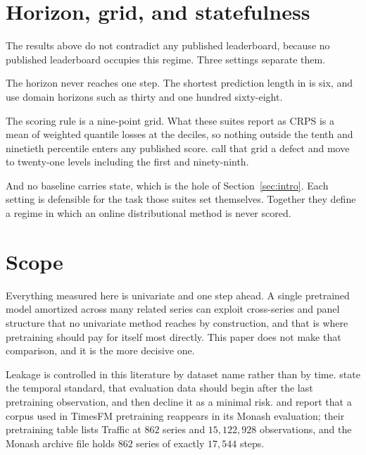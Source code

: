 \documentclass[article]{jss}
\begin{document}
\section{Horizon, grid, and statefulness}\label{sec:suites}

The results above do not contradict any published leaderboard, because no
published leaderboard occupies this regime. Three settings separate them.

The horizon never reaches one step. The shortest prediction length in
\citet{aksu2024gifteval} is six, and \citet{shchur2025fevbench} use domain
horizons such as thirty and one hundred sixty-eight.

The scoring rule is a nine-point grid. What these suites report as CRPS is a
mean of weighted quantile losses at the deciles, so nothing outside the tenth
and ninetieth percentile enters any published score.
\citet{ansari2025chronos2} call that grid a defect and move to twenty-one
levels including the first and ninety-ninth.

And no baseline carries state, which is the hole of Section~\ref{sec:intro}.
Each setting is defensible for the task those suites set themselves. Together
they define a regime in which an online distributional method is never scored.

\section{Scope}\label{sec:scope}

Everything measured here is univariate and one step ahead. A single pretrained
model amortized across many related series can exploit cross-series and panel
structure that no univariate method reaches by construction, and that is where
pretraining should pay for itself most directly. This paper does not make that
comparison, and it is the more decisive one.

Leakage is controlled in this literature by dataset name rather than by time.
\citet{ansari2024chronos} state the temporal standard, that evaluation data
should begin after the last pretraining observation, and then decline it as a
minimal risk. \citet{meyer2025leakage} and \citet{oreshkin2026simulation} report
that a corpus used in TimesFM pretraining reappears in its Monash evaluation;
their pretraining table lists Traffic at $862$ series and $15{,}122{,}928$
observations, and the Monash archive file \citep{zenodo-traffic-hourly} holds
$862$ series of exactly $17{,}544$ steps.
\end{document}
